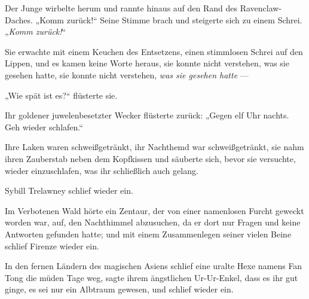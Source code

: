 Der Junge wirbelte herum und rannte hinaus auf den Rand des Ravenclaw-Daches.
„Komm zurück!“ Seine Stimme brach und steigerte sich zu einem Schrei.
„\emph{Komm zurück!}“


Sie erwachte mit einem Keuchen des Entsetzens, einen stimmlosen Schrei auf den Lippen, und es kamen keine Worte heraus, sie konnte nicht verstehen, was sie gesehen hatte, sie konnte nicht verstehen, \emph{was sie gesehen hatte} —

„Wie spät ist es?“ flüsterte sie.

Ihr goldener juwelenbesetzter Wecker flüsterte zurück:
„Gegen elf Uhr nachts. Geh wieder schlafen.“

Ihre Laken waren schweißgetränkt, ihr Nachthemd war schweißgetränkt, sie nahm ihren Zauberstab neben dem Kopfkissen und säuberte sich, bevor sie versuchte, wieder einzuschlafen, was ihr schließlich auch gelang.

Sybill Trelawney schlief wieder ein.

\later

Im Verbotenen Wald hörte ein Zentaur, der von einer namenlosen Furcht geweckt worden war, auf, den Nachthimmel abzusuchen, da er dort nur Fragen und keine Antworten gefunden hatte; und mit einem Zusammenlegen seiner vielen Beine schlief Firenze wieder ein.

\later

In den fernen Ländern des magischen Asiens schlief eine uralte Hexe namens Fan Tong die müden Tage weg, sagte ihrem ängstlichen Ur-Ur-Enkel, dass es ihr gut ginge, es sei nur ein Albtraum gewesen, und schlief wieder ein.

